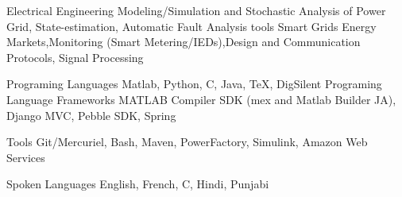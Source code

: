\begin{cvskills}

\cvskill
{Electrical Engineering}
{Modeling/Simulation and Stochastic Analysis of Power Grid, State-estimation, Automatic Fault Analysis tools}
\cvskill
{Smart Grids}
{Energy Markets,Monitoring (Smart Metering/IEDs),Design and Communication Protocols, Signal Processing}

\cvskill
{Programing Languages}
{Matlab, Python, C, Java, TeX, DigSilent Programing Language}
\cvskill
{Frameworks}
{MATLAB Compiler SDK (mex and Matlab Builder JA), Django MVC, Pebble SDK, Spring}

\cvskill
{Tools}
{Git/Mercuriel, Bash, Maven, PowerFactory, Simulink, Amazon Web Services}

\cvskill
{Spoken Languages}
{English, French, C, Hindi, Punjabi}

\end{cvskills}
